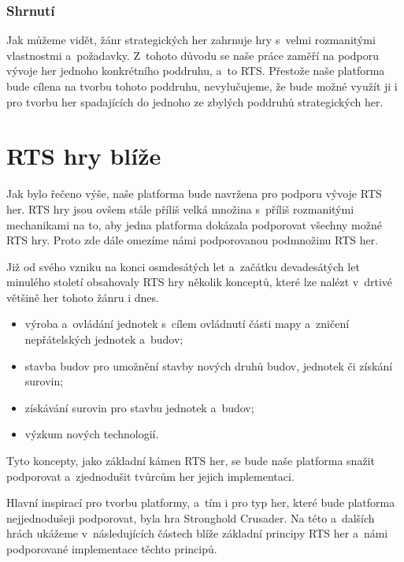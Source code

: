 \subsubsection{Shrnutí}

Jak můžeme vidět, žánr strategických her zahrnuje hry s~velmi rozmanitými vlastnostmi a~požadavky. Z~tohoto důvodu se naše práce zaměří na podporu vývoje her jednoho konkrétního poddruhu, a~to RTS. Přestože naše platforma bude cílena na tvorbu tohoto poddruhu, nevylučujeme, že bude možné využít ji i pro tvorbu her spadajících do jednoho ze zbylých poddruhů strategických her.


\section{RTS hry blíže}
Jak bylo řečeno výše, naše platforma bude navržena pro podporu vývoje RTS her. RTS hry jsou ovšem stále příliš velká množina s~příliš rozmanitými mechanikami na to, aby jedna platforma dokázala podporovat všechny možné RTS hry. Proto zde dále omezíme námi podporovanou podmnožinu RTS her.

Již od svého vzniku na konci osmdesátých let a~začátku devadesátých let minulého století obsahovaly RTS hry několik konceptů, které lze nalézt v~drtivé většině her tohoto žánru i dnes. 

\begin{itemize}
	\item výroba a~ovládání jednotek s~cílem ovládnutí části mapy a~zničení nepřátelských jednotek a~budov;
	\item stavba budov pro umožnění stavby nových druhů budov, jednotek či získání surovin;
	\item získávání surovin pro stavbu jednotek a~budov;
	\item výzkum nových technologií.
\end{itemize}

Tyto koncepty, jako základní kámen RTS her, se bude naše platforma snažit podporovat a~zjednodušit tvůrcům her jejich implementaci.

Hlavní inspirací pro tvorbu platformy, a~tím i pro typ her, které bude platforma nejjednodušeji podporovat, byla hra Stronghold Crusader. Na této a~dalších hrách ukážeme v~následujících částech blíže základní principy RTS her a~námi podporované implementace těchto principů.

\done
{}
